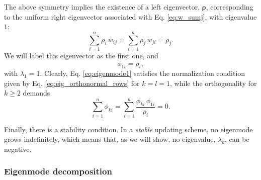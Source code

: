 \documentclass[reprint, superscriptaddress, floatfix]{revtex4-1}
\begin{document}
The above symmetry implies the existence of
a left eigenvector, $\pmb \rho$,
corresponding to the uniform right eigenvector
associated with Eq. \eqref{eq:w_sumj},
with eigenvalue $1$:
%
\begin{equation}
  \sum_{i = 1}^n \rho_i \, w_{ij}
  =
  \sum_{i = 1}^n \rho_j \, w_{ji}
  =
  \rho_j
  .
  \label{eq:w_balance}
\end{equation}
%
We will label this eigenvector as the first one,
and
%
\begin{equation}
  \phi_{1i} = \rho_i,
\label{eq:eigenmode1}
\end{equation}
%
with $\lambda_1 = 1$.
%
Clearly, Eq. \eqref{eq:eigenmode1}
satisfies the normalization condition
given by Eq. \eqref{eq:eig_orthonormal_rows}
for $k = l = 1$,
while the orthogonality for $k \ge 2$ demands
%
\begin{equation}
  \sum_{ i = 1 }^n \phi_{ki}
  =
  \sum_{ i = 1 }^n
    \frac{ \phi_{ki} \, \phi_{1i} }
         { \rho_i }
  =
  0
  .
\label{eq:ortho1}
\end{equation}

Finally, there is a stability condition.
%
In a \emph{stable} updating scheme,
no eigenmode grows indefinitely,
which means that, as we will show, no eigenvalue, $\lambda_k$,
can be negative.




\subsubsection{Eigenmode decomposition}
\end{document}
